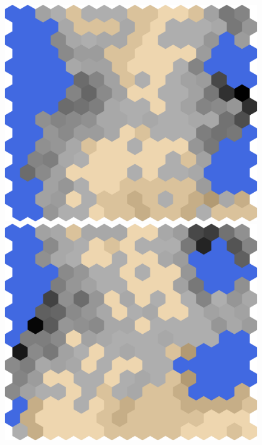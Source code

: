 \documentclass[conference]{IEEEtran}
\theoremstyle{definition}
\begin{document}
\begin{figure}
\begin{minipage}{.19\textwidth}
		\includegraphics[width=\textwidth]{tf-h}
	\end{minipage}
	\begin{minipage}{.19\textwidth}
		\centering
		\includegraphics[width=\textwidth]{tf-i}
	\end{minipage}
	\begin{minipage}{.19\textwidth}
		\centering

\end{minipage}
\end{figure}
\end{document}

